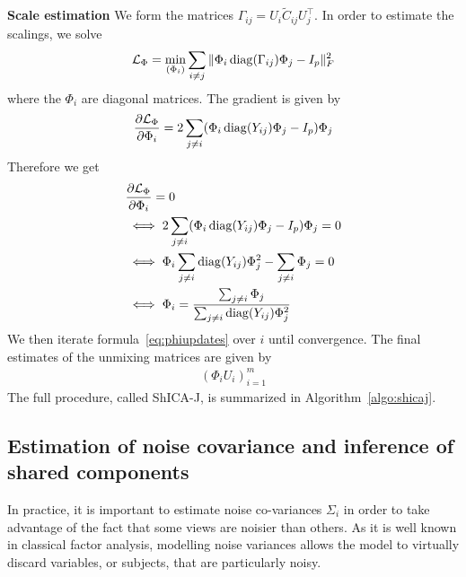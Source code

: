 \textbf{Scale estimation}
We form the matrices $\Gamma_{ij} = U_i\tilde{C}_{ij}U_j^\top$. In order to
estimate the scalings, we solve
\begin{align}
\loss_{\Phi} = \min_{(\Phi_i)} \sum_{i\neq j} \| \Phi_i \diag(\Gamma_{ij}) \Phi_j - I_p \|_F^2
\end{align}
where the $\Phi_i$ are diagonal matrices.
The gradient is given by
\begin{align}
  \partialfrac{\Phi_i}{\loss_{\Phi}} = 2\sum_{j \neq i} (\Phi_i \diag(Y_{ij}) \Phi_j - I_p) \Phi_j
\end{align}
Therefore we get
\begin{align}
  &\partialfrac{\Phi_i}{\loss_{\Phi}} = 0 \\
  &\iff 2\sum_{j \neq i} (\Phi_i \diag(Y_{ij}) \Phi_j - I_p) \Phi_j = 0 \\
  &\iff \Phi_i \sum_{j \neq i} \diag(Y_{ij}) \Phi_j^2 - \sum_{j \neq i} \Phi_j = 0 \\
  &\iff \Phi_i = \frac{\sum_{j \neq i} \Phi_j}{\sum_{j \neq i} \diag(Y_{ij}) \Phi_j^2}
    \label{eq:phiupdates}
\end{align}
We then iterate formula~\eqref{eq:phiupdates} over $i$ until convergence.
The final estimates of the unmixing matrices are given by
\begin{align}
  (\Phi_i U_i)_{i=1}^m
\end{align}
The full procedure, called ShICA-J, is summarized in Algorithm~\ref{algo:shicaj}.

\subsection{Estimation of noise covariance and inference of shared components}

In practice, it is important to estimate noise co-variances $\Sigma_i$ in order to take advantage of the fact that some views are noisier than others. As it is well known in classical factor analysis, modelling noise variances allows the model to virtually discard variables, or subjects, that are particularly noisy. 

